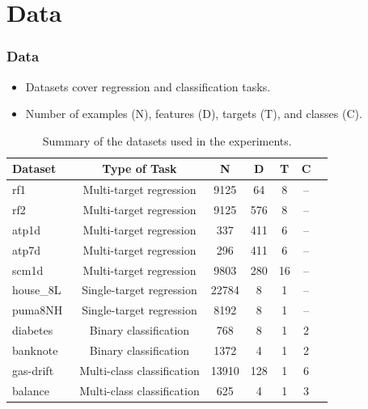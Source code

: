 \documentclass{beamer}
\begin{document}
\section{Data}
\begin{frame}
  \frametitle{Data}
  \begin{itemize}
    \item Datasets cover regression and classification tasks.
    \item Number of examples (N), features (D), targets (T), and classes (C).
  \end{itemize}
  
  \begin{table}[h!]
    \centering
    \caption{Summary of the datasets used in the experiments.}
    \label{tab:datasets}
    \scriptsize %
    \begin{tabular}{lcccccc}
    \toprule
    \textbf{Dataset} & \textbf{Type of Task} & \textbf{N} & \textbf{D} & \textbf{T} & \textbf{C} \\
    \midrule
    rf1~\cite{mulan}              & Multi-target regression  & 9125   & 64   & 8  & -- \\
    rf2~\cite{mulan}              & Multi-target regression  & 9125   & 576  & 8  & -- \\
    atp1d~\cite{mulan}            & Multi-target regression  & 337    & 411  & 6  & -- \\
    atp7d~\cite{mulan}            & Multi-target regression  & 296    & 411  & 6  & -- \\
    scm1d~\cite{mulan}            & Multi-target regression  & 9803   & 280  & 16 & -- \\
    house\_8L~\cite{openml}        & Single-target regression & 22784  & 8    & 1  & -- \\
    puma8NH~\cite{openml}          & Single-target regression & 8192   & 8    & 1  & -- \\
    diabetes~\cite{openml}         & Binary classification    & 768    & 8    & 1  & 2 \\
    banknote~\cite{openml}         & Binary classification    & 1372   & 4    & 1  & 2 \\
    gas-drift~\cite{openml}        & Multi-class classification & 13910 & 128  & 1  & 6 \\
    balance~\cite{openml}          & Multi-class classification & 625   & 4    & 1  & 3 \\
    \bottomrule
    \end{tabular}
  \end{table}
  
\end{frame}
\end{document}
